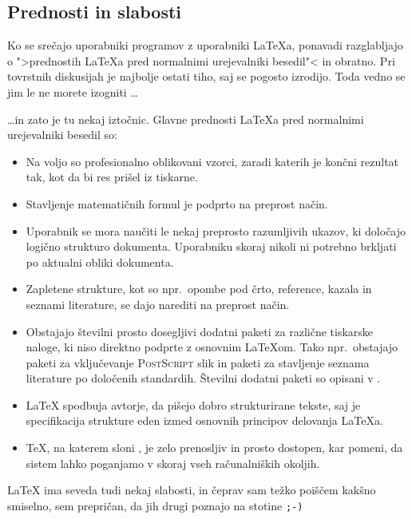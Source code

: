 \subsection{Prednosti in slabosti}

Ko se srečajo uporabniki  programov z uporabniki \LaTeX{}a,
ponavadi razglabljajo o ">prednostih \LaTeX{}a pred normalnimi urejevalniki
besedil"< in obratno. Pri tovrstnih diskusijah je najbolje ostati tiho, saj se pogosto 
izrodijo. Toda vedno se jim le ne morete izogniti \ldots

\medskip\noindent \ldots in zato je tu nekaj iztočnic. Glavne prednosti 
\LaTeX{}a pred normalnimi urejevalniki besedil so:

\begin{itemize}

\item Na voljo so profesionalno oblikovani vzorci, zaradi katerih je končni rezultat tak,
   kot da bi res prišel iz tiskarne.
\item Stavljenje matematičnih formul je podprto na preprost način.
\item Uporabnik se mora naučiti le nekaj preprosto razumljivih ukazov, ki določajo
  logično strukturo dokumenta. Uporabniku skoraj nikoli ni potrebno brkljati po
  aktualni obliki dokumenta.
\item Zapletene strukture, kot so npr.~opombe pod črto, reference, 
  kazala in seznami literature, se dajo narediti na preprost način.
\item Obstajajo številni prosto dosegljivi dodatni paketi za različne 
  tiskarske naloge, ki niso direktno podprte z osnovnim \LaTeX{}om. 
  Tako npr.~obstajajo paketi za vključevanje \textsc{PostScript} slik in 
  paketi za stavljenje seznama literature po določenih standardih. 
  Številni dodatni paketi so opisani v \companion.
\item \LaTeX{} spodbuja avtorje, da pišejo dobro strukturirane tekste,
  saj je specifikacija strukture eden izmed osnovnih principov delovanja \LaTeX{}a.
\item \TeX, na katerem sloni \LaTeXe, je zelo prenosljiv in prosto dostopen,
  kar pomeni, da sistem lahko poganjamo v skoraj vseh računalniških okoljih.

%
%
\end{itemize}

\medskip

\noindent\LaTeX{} ima seveda tudi nekaj slabosti, in čeprav sam težko 
poiščem kakšno smiselno, sem prepričan, da jih drugi 
poznajo na stotine \texttt{;-)}

